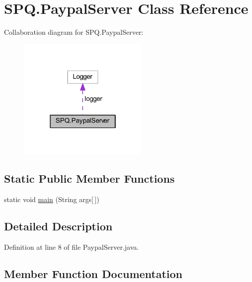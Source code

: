 \hypertarget{class_s_p_q_1_1_paypal_server}{}\section{S\+P\+Q.\+Paypal\+Server Class Reference}
\label{class_s_p_q_1_1_paypal_server}


Collaboration diagram for S\+P\+Q.\+Paypal\+Server\+:\nopagebreak
\begin{figure}[H]
\begin{center}
\leavevmode
\includegraphics[width=178pt]{class_s_p_q_1_1_paypal_server__coll__graph}
\end{center}
\end{figure}
\subsection*{Static Public Member Functions}
\begin{DoxyCompactItemize}
\item 
static void \mbox{\hyperlink{class_s_p_q_1_1_paypal_server_aa704ce67562c143df7cdaf34f74f59ac}{main}} (String args\mbox{[}$\,$\mbox{]})
\end{DoxyCompactItemize}


\subsection{Detailed Description}


Definition at line 8 of file Paypal\+Server.\+java.



\subsection{Member Function Documentation}
\mbox{\label{class_s_p_q_1_1_paypal_server_aa704ce67562c143df7cdaf34f74f59ac}} 
